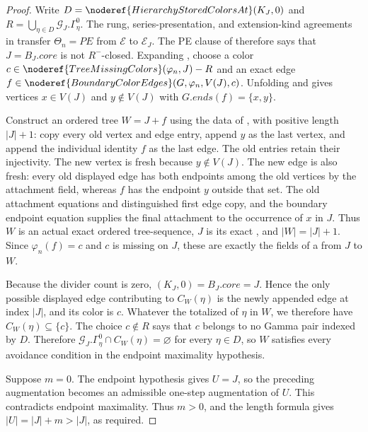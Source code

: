 \begin{proof}
Write
$D=\noderef{HierarchyStoredColorsAt}(K_J,0)$ and
$R=\bigcup_{\eta\in D}\mathcal G_J.\Gamma^0_\eta$.
The rung, series-presentation, and extension-kind agreements in
 transfer $\Theta_n=PE$
from $\mathcal E$ to $\mathcal E_J$.  The PE clause of
 therefore says that
$J=B_J.\mathit{core}$ is not $R^-$-closed.  Expanding
, choose a color
$c\in\noderef{TreeMissingColors}(\varphi_n,J)-R$ and an exact edge
$f\in\noderef{BoundaryColorEdges}(G,\varphi_n,V(J),c)$.
Unfolding  and  gives
vertices $x\in V(J)$ and $y\notin V(J)$ with
$G.\mathit{ends}(f)=\{x,y\}$.

Construct an ordered tree $W=J+f$ using the data of
, with positive length $|J|+1$: copy every old
vertex and edge entry, append $y$ as the last vertex, and append the
individual identity $f$ as the last
edge.  The old entries retain their injectivity.  The new vertex is fresh
because $y\notin V(J)$.  The new edge is also fresh: every old displayed
edge has both endpoints among the old vertices by the attachment field,
whereas $f$ has the endpoint $y$ outside that set.  The old attachment
equations and distinguished first edge copy, and the boundary endpoint
equation supplies the final attachment to the occurrence of $x$ in $J$.
Thus $W$ is an actual exact ordered tree-sequence, $J$ is its exact
, and
$|W|=|J|+1$.  Since $\varphi_n(f)=c$ and $c$ is missing on $J$, these are
exactly the fields of a
 from $J$ to $W$.

Because the divider count is zero,
$(K_J,0)=B_J.\mathit{core}=J$.  Hence the
only possible displayed edge contributing to $C_W(\eta)$ is the newly
appended edge at index $|J|$, and its color is $c$.  Whatever the
totalized  of $\eta$ in $W$,
we therefore have $C_W(\eta)\subseteq\{c\}$.  The choice $c\notin R$
says that $c$ belongs to no Gamma pair indexed by $D$.  Therefore
$\mathcal G_J.\Gamma^0_\eta\cap C_W(\eta)=\varnothing$ for every
$\eta\in D$, so $W$ satisfies every avoidance condition in the
endpoint maximality hypothesis.

Suppose $m=0$.  The endpoint hypothesis gives $U=J$, so the preceding
augmentation becomes an admissible one-step augmentation of $U$.  This
contradicts endpoint maximality.  Thus $m>0$, and the length formula gives
$|U|=|J|+m>|J|$, as required.
\end{proof}
